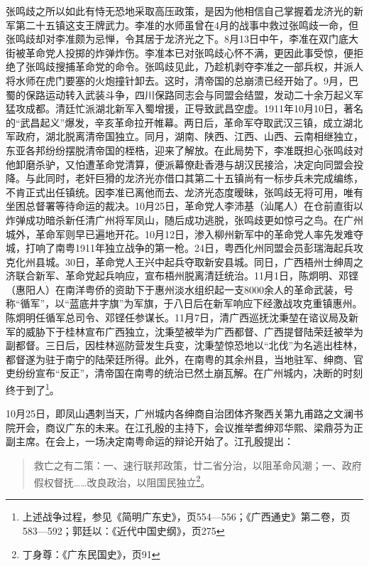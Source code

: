 张鸣歧之所以如此有恃无恐地采取高压政策，是因为他相信自己掌握着龙济光的新军第二十五镇这支王牌武力。李准的水师虽曾在4月的战事中救过张鸣歧一命，但张鸣歧却对李准颇为忌惮，令其居于龙济光之下。8月13日中午，李准在双门底大街被革命党人投掷的炸弹炸伤。李准本已对张鸣歧心怀不满，更因此事受惊，便拒绝了张鸣歧搜捕革命党的命令。张鸣歧见此，乃趁机剥夺李准之一部兵权，并派人将水师在虎门要塞的火炮撞针卸去。这时，清帝国的总崩溃已经开始了。9月，巴蜀的保路运动转入武装斗争，四川保路同志会与同盟会结盟，发动二十余万起义军猛攻成都。清廷忙派湖北新军入蜀增援，正导致武昌空虚。1911年10月10日，著名的“武昌起义”爆发，辛亥革命拉开帷幕。两日后，革命军夺取武汉三镇，成立湖北军政府，湖北脱离清帝国独立。同月，湖南、陕西、江西、山西、云南相继独立，东亚各邦纷纷摆脱清帝国的桎梏，迎来了解放。在此局势下，李准既担心张鸣歧对他卸磨杀驴，又怕遭革命党清算，便派幕僚赴香港与胡汉民接洽，决定向同盟会投降。与此同时，老奸巨猾的龙济光亦借口其第二十五镇尚有一标步兵未完成编练，不肯正式出任镇统。因李准已离他而去、龙济光态度暧昧，张鸣歧无将可用，唯有坐困总督署等待命运的裁决。10月25日，革命党人李沛基（汕尾人）在仓前直街以炸弹成功暗杀新任清广州将军凤山，随后成功逃脱，张鸣歧更如惊弓之鸟。在广州城外，革命军则早已遍地开花。10月12日，渗入柳州新军中的革命党人率先发难夺城，打响了南粤1911年独立战争的第一枪。24日，粤西化州同盟会员彭瑞海起兵攻克化州县城。30日，革命党人王兴中起兵夺取新安县城。同日，广西梧州士绅周之济联合新军、革命党起兵响应，宣布梧州脱离清廷统治。11月1日，陈炯明、邓铿（惠阳人）在南洋粤侨的资助下于惠州淡水组织起一支8000余人的革命武装，号称“循军”，以“蓝底井字旗”为军旗，于八日后在新军响应下经激战攻克重镇惠州。陈炯明任循军总司令、邓铿任参谋长。11月7日，清广西巡抚沈秉堃在谘议局及新军的威胁下于桂林宣布广西独立，沈秉堃被举为广西都督、广西提督陆荣廷被举为副都督。三日后，因桂林巡防营发生兵变，沈秉堃惊恐地以“北伐”为名逃出桂林，都督遂为驻于南宁的陆荣廷所得。此外，在南粤的其余州县，当地驻军、绅商、官吏纷纷宣布“反正”，清帝国在南粤的统治已然土崩瓦解。在广州城内，决断的时刻终于到了\footnote{上述战争过程，参见《简明广东史》，页554—556；《广西通史》第二卷，页583—592；郭廷以：《近代中国史纲》，页275}。

10月25日，即凤山遇刺当天，广州城内各绅商自治团体齐聚西关第九甫路之文澜书院开会，商议广东的未来。在江孔殷的主持下，会议推举耆绅邓华熙、梁鼎芬为正副主席。在会上，一场决定南粤命运的辩论开始了。江孔殷提出：

\begin{quote}

救亡之有二策：一、速行联邦政策，廿二省分治，以阻革命风潮；一、政府假权督抚……改良政治，以阻国民独立\footnote{丁身尊：《广东民国史》，页91}。

\end{quote}

